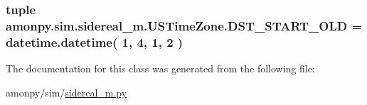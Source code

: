 \hypertarget{classamonpy_1_1sim_1_1sidereal__m_1_1_u_s_time_zone_a6a44aff78ec6d41c874c5a47faad7bbe}{
\subsubsection[{D\-S\-T\-\_\-\-S\-T\-A\-R\-T\-\_\-\-O\-L\-D}]{\setlength{\rightskip}{0pt plus 5cm}tuple amonpy.\-sim.\-sidereal\-\_\-m.\-U\-S\-Time\-Zone.\-D\-S\-T\-\_\-\-S\-T\-A\-R\-T\-\_\-\-O\-L\-D = datetime.\-datetime( 1, 4, 1, 2 )\hspace{0.3cm}{\ttfamily [static]}}}\label{classamonpy_1_1sim_1_1sidereal__m_1_1_u_s_time_zone_a6a44aff78ec6d41c874c5a47faad7bbe}


The documentation for this class was generated from the following file\-:\begin{DoxyCompactItemize}
\item 
amonpy/sim/\hyperlink{sidereal__m_8py}{sidereal\-\_\-m.\-py}\end{DoxyCompactItemize}
